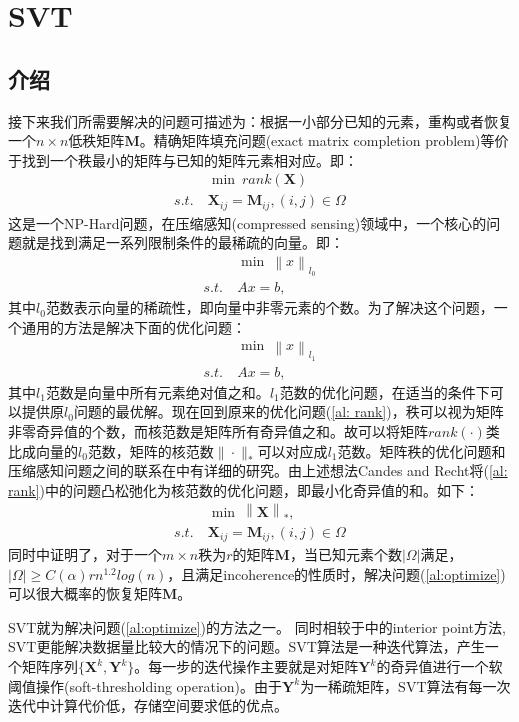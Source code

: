 \chapter{SVT}
\label{cha:SVT}
\section{介绍}
接下来我们所需要解决的问题可描述为：根据一小部分已知的元素，重构或者恢复一个$n\times n$低秩矩阵$\mathbf{M}$。精确矩阵填充问题(exact matrix completion problem)等价于找到一个秩最小的矩阵与已知的矩阵元素相对应。即：
\begin{align}
\label{al: rank}
&\min \ rank(\mathbf{X}) \nonumber\\
s.t.\ &\mathbf{X}_{ij} = \mathbf{M}_{ij}, (i,j)\in \Omega
\end{align}
这是一个NP-Hard问题，在压缩感知(compressed sensing)领域中，一个核心的问题就是找到满足一系列限制条件的最稀疏的向量。即：
\begin{align*}
&\min \ \left\|x\right\|_{l_0}\\
s.t.\ &Ax = b,
\end{align*}
其中$l_0$范数表示向量的稀疏性，即向量中非零元素的个数。为了解决这个问题，一个通用的方法是解决下面的优化问题：
\begin{align*}
&\min \ \left\|x\right\|_{l_1}\\
s.t.\ & Ax = b,
\end{align*}
其中$l_1$范数是向量中所有元素绝对值之和。$l_1$范数的优化问题，在适当的条件下可以提供原$l_0$问题的最优解。现在回到原来的优化问题(\ref{al: rank})，秩可以视为矩阵非零奇异值的个数，而核范数是矩阵所有奇异值之和。故可以将矩阵$rank(\cdot)$类比成向量的$l_0$范数，矩阵的核范数$\|\cdot\|_*$可以对应成$l_1$范数。矩阵秩的优化问题和压缩感知问题之间的联系在\cite{recht2010guaranteed}中有详细的研究。由上述想法Candes and Recht将(\ref{al: rank})中的问题凸松弛化为核范数的优化问题，即最小化奇异值的和\cite{candes2009exact}。如下：
\begin{align}
\label{al:optimize}
&\min \ \left\|\mathbf{X}\right\|_* , \nonumber\\
s.t.\ &\mathbf{X}_{ij} = \mathbf{M}_{ij}, (i,j)\in \Omega
\end{align}
同时\cite{candes2009exact}中证明了，对于一个$m\times n$秩为$r$的矩阵$\mathbf{M}$，当已知元素个数$|\Omega|$满足，$|\Omega|\geq C(\alpha) r n^{1.2}log(n)$，且满足incoherence的性质时，解决问题(\ref{al:optimize})可以很大概率的恢复矩阵$\mathbf{M}$。

SVT就为解决问题(\ref{al:optimize})的方法之一。 同时相较于\cite{liu2009interior}中的interior point方法, SVT更能解决数据量比较大的情况下的问题。SVT算法是一种迭代算法，产生一个矩阵序列$\{\mathbf{X}^k,\mathbf{Y}^k\}$。每一步的迭代操作主要就是对矩阵$\mathbf{Y}^k$的奇异值进行一个软阈值操作(soft-thresholding operation)。由于$\mathbf{Y}^k$为一稀疏矩阵，SVT算法有每一次迭代中计算代价低，存储空间要求低的优点。


